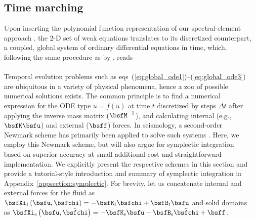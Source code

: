 \subsection{Time marching}
Upon inserting the polynomial function representation of our spectral-element
approach \citep[][eqs~(12)--(13)]{nissen+:07b}, the 2-D set of weak equations
translates to its discretized counterpart, a coupled, global system of
ordinary differential equations in time, which, following the same procedure
as by \citet[][Section~4]{nissen+:07b}, reads
%
\eqa \label{eq:global_ode}
\label{eq:global_ode1}\\
\label{eq:global_ode2}\\
\label{eq:global_ode3}
\ena
%
Temporal evolution problems such as
eqs~(\ref{eq:global_ode1})--(\ref{eq:global_ode3}) are ubiquitous in a
variety of physical phenomena, hence a zoo of possible numerical
solutions exists.
The common principle is to find a numerical expression for the ODE type
$\ddot{u}=f(u)$ at time $t$ discretized by steps $\Delta t$
after applying the inverse mass matrix ($\bsfM^{-1}$), and calculating
internal (e.g., $\bsfK\bsfu$) and external ($\bsff$) forces.
In seismology, a second-order Newmark scheme has primarily been applied to
solve such systems \citep{KoVi98}.
Here, we employ this Newmark scheme, but will also argue for symplectic
integration based on superior accuracy at small additional cost and
straightforward implementation. We explicitly present the respective schemes
in this section and provide a tutorial-style introduction and summary of
symplectic integration in Appendix~\ref{appsection:symplectic}.
For brevity, let us concatenate internal and external forces for the
fluid as
$\bsfXi_{\rm f}\left(\bsfu,\bsfchi\right)=
-\bsfK_{\rm f}\bsfchi+\bsfB_{\rm f}\bsfu$ and solid domains as
$\bsfXi_{\rm s}\left(\bsfu,\ddot{\bsfchi}\right)=
-\bsfK_{\rm s}\bsfu-\bsfB_{\rm s}
\ddot{\bsfchi}
+\bsff$.
%
%
